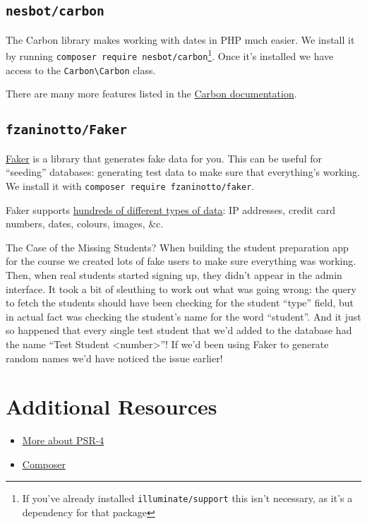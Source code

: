 


\subsection{\texttt{nesbot/carbon}}

The Carbon library makes working with dates in PHP much easier. We install it by running \texttt{composer require nesbot/carbon}\footnote{If you've already installed \texttt{illuminate/support} this isn't necessary, as it's a dependency for that package}. Once it's installed we have access to the \texttt{Carbon\textbackslash Carbon} class.


There are many more features listed in the \href{https://carbon.nesbot.com/docs/}{Carbon documentation}.


\subsection{\texttt{fzaninotto/Faker}}

\href{https://github.com/fzaninotto/Faker}{Faker} is a library that generates fake data for you. This can be useful for ``seeding'' databases: generating test data to make sure that everything's working. We install it with \texttt{composer require fzaninotto/faker}.


Faker supports \href{https://github.com/fzaninotto/Faker#formatters}{hundreds of different types of data}: IP addresses, credit card numbers, dates, colours, images, \&c.


\begin{infobox}{The Case of the Missing Students?}
    When building the student preparation app for the course we created lots of fake users to make sure everything was working. Then, when real students started signing up, they didn't appear in the admin interface. It took a bit of sleuthing to work out what was going wrong: the query to fetch the students should have been checking for the student ``type'' field, but in actual fact was checking the student's name for the word ``student''. And it just so happened that every single test student that we'd added to the database had the name ``Test Student <number>''! If we'd been using Faker to generate random names we'd have noticed the issue earlier!
\end{infobox}

\section{Additional Resources}

\begin{itemize}[leftmargin=*]
    \item \href{https://www.php-fig.org/psr/psr-4/meta/}{More about PSR-4}
    \item \href{https://getcomposer.org}{Composer}
\end{itemize}

